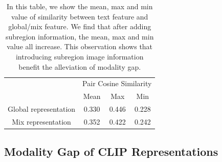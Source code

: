\begin{table}[t]
\small
\centering
\tabcolsep=2pt
\begin{tabular}{c|ccc}
\toprule
\toprule
\multirow{2}{*}{} & \multicolumn{3}{l}{Pair Cosine Similarity} \\
                         & Mean        & Max        & Min        \\ \hline
 Global representation           & 0.330       & 0.446      & 0.228      \\ \hline

Mix representation             & 0.352       & 0.422      & 0.242      \\ \toprule
\end{tabular}
\caption{In this table, we show the mean, max and min value of similarity between text feature and global/mix feature. We find that after adding subregion information, the mean, max and min value all increase. This observation shows that introducing subregion image information benefit the alleviation of modality gap.}
\label{table:subregion}
\end{table}

\subsection{Modality Gap of CLIP Representations}

